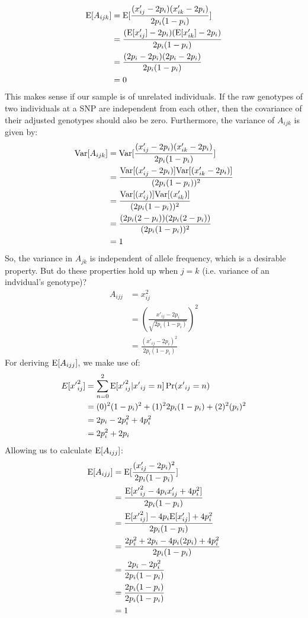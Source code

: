 \documentclass[12pt]{article}
\begin{document}
\begin{align*}
    \mathrm{E}[A_{ijk}] &= \mathrm{E}[\frac{(x'_{ij} - 2 p_i)(x'_{ik} - 2 p_i)}{2 p_i (1 - p_i)}] \\
    &= \frac{(\mathrm{E}[x'_{ij}] - 2 p_i)(\mathrm{E}[x'_{ik}] - 2 p_i)}{2 p_i (1 - p_i)} \\
    &= \frac{(2 p_i - 2 p_i)(2 p_i - 2 p_i)}{2 p_i (1 - p_i)} \\
    &= 0
\end{align*}
This makes sense if our sample is of unrelated individuals.
If the raw genotypes of two individuals at a SNP are independent from each other, then the covariance of their adjusted genotypes should also be zero.
Furthermore, the variance of $A_{ijk}$ is given by:
\begin{align*}
    \mathrm{Var}[A_{ijk}] &= \mathrm{Var}[\frac{(x'_{ij} - 2 p_i)(x'_{ik} - 2 p_i)}{2 p_i (1 - p_i)}] \\
    &= \frac{\mathrm{Var}[(x'_{ij} - 2 p_i)]\mathrm{Var}[(x'_{ik} - 2 p_i)]}{(2 p_i (1 - p_i))^2} \\
    &= \frac{\mathrm{Var}[(x'_{ij})]\mathrm{Var}[(x'_{ik})]}{(2 p_i (1 - p_i))^2} \\
    &= \frac{(2 p_i (2 - p_i))(2 p_i (2 - p_i))}{(2 p_i (1 - p_i))^2} \\
    &= 1
\end{align*}
So, the variance in $A_{jk}$ is independent of allele frequency, which is a desirable property.
But do these properties hold up when $j = k$ (i.e. variance of an indvidual's genotype)?
\begin{align*}
    A_{ijj} &= x_{ij}^2 \\
    &= (\frac{x'_{ij} - 2 p_i}{\sqrt{2 p_i (1 - p_i)}})^2 \\
    &= \frac{(x'_{ij} - 2 p_i)^2}{2 p_i (1 - p_i)}
\end{align*}
For deriving $\mathrm{E}[A_{ijj}]$, we make use of:
\begin{align*}
    E[{x'}_{ij}^2] &= \sum_{n=0}^{2} \mathrm{E}[{x'}_{ij}^2 | {x'}_{ij}=n] \Pr({x'}_{ij}=n) \\
    &= (0)^2 (1-p_i)^2 + (1)^2 2 p_i (1-p_i) + (2)^2 (p_i)^2 \\
    &= 2 p_i - 2 p_i^2 + 4 p_i^2 \\
    &= 2 p_i^2 + 2 p_i
\end{align*}
Allowing us to calculate $\mathrm{E}[A_{ijj}]$:
\begin{align*}
    \mathrm{E}[A_{ijj}] &= \mathrm{E}[\frac{(x'_{ij} - 2 p_i)^2}{2 p_i (1 - p_i)}] \\
    &= \frac{\mathrm{E}[{x'}_{ij}^2 - 4 p_i x'_{ij} + 4 p_i^2]}{2 p_i (1 - p_i)} \\
    &= \frac{\mathrm{E}[{x'}_{ij}^2] - 4 p_i \mathrm{E}[x'_{ij}] + 4 p_i^2}{2 p_i (1 - p_i)} \\
    &= \frac{2 p_i^2 + 2 p_i - 4 p_i (2 p_i) + 4 p_i^2}{2 p_i (1 - p_i)} \\
    &= \frac{2 p_i - 2 p_i^2}{2 p_i (1 - p_i)} \\
    &= \frac{2 p_i (1 - p_i)}{2 p_i (1 - p_i)} \\
    &= 1
\end{align*}
\end{document}
